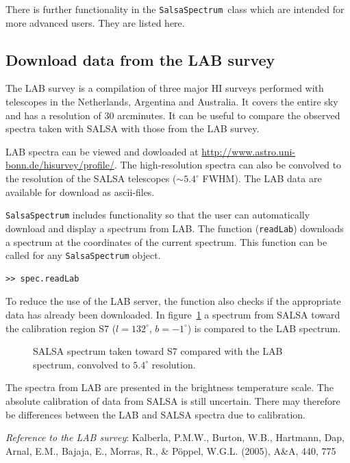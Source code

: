 \documentclass[11pt,a4paper]{article}
\begin{document}
There is further functionality in the \texttt{SalsaSpectrum}~class
which are intended for more advanced users. They are listed here.

\subsection{Download data from the LAB survey}
\label{sec:download-data-from}

The LAB survey is a compilation of three major HI surveys performed
with telescopes in the Netherlands, Argentina and Australia. It covers
the entire sky and has a resolution of $30$ arcminutes. It can be
useful to compare the observed spectra taken with SALSA with those
from the LAB survey.

LAB spectra can be viewed and dowloaded at
\url{http://www.astro.uni-bonn.de/hisurvey/profile/}. The
high-resolution spectra can also be convolved to the resolution of the
SALSA telescopes ($\sim 5.4^{\circ}$ FWHM). The LAB data are available
for download as ascii-files.

\texttt{SalsaSpectrum} includes functionality so that the user can
automatically download and display a spectrum from LAB. The function
(\texttt{readLab}) downloads a spectrum at the coordinates of the
current spectrum. This function can be called for any
\texttt{SalsaSpectrum} object.

\begin{lstlisting}
>> spec.readLab
\end{lstlisting}

To reduce the use of the LAB server, the function also checks if the
appropriate data has already been downloaded. In figure~\ref{fig:lab}
a spectrum from SALSA toward the calibration region S7
($l=132^{\circ}$, $b=-1^{\circ}$) is compared to the LAB spectrum.

\begin{figure}[h]
  \centering
  \caption{SALSA spectrum taken toward S7 compared with the LAB
    spectrum, convolved to $5.4^{\circ}$ resolution.}
  \label{fig:lab}
\end{figure}

The spectra from LAB are presented in the brightness temperature
scale. The absolute calibration of data from SALSA is still
uncertain. There may therefore be differences between the LAB and
SALSA spectra due to calibration. 

\emph{Reference to the LAB survey}: Kalberla, P.M.W., Burton, W.B.,
Hartmann, Dap, Arnal, E.M., Bajaja, E., Morras, R., \& P\"{o}ppel,
W.G.L. (2005), A\&A, 440, 775
\end{document}
